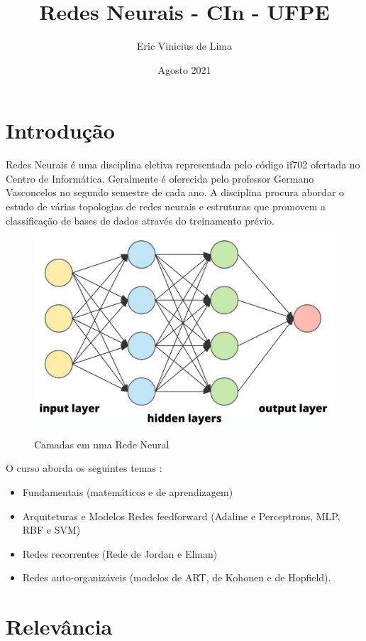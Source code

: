 \documentclass{article}
\title{Redes Neurais - CIn - UFPE}
\author{Eric Vinicius de Lima}
\date{Agosto 2021}
\begin{document}
\maketitle

\section{Introdução}

Redes Neurais é uma disciplina eletiva representada pelo código if702 ofertada no Centro de Informática. Geralmente é oferecida pelo professor Germano Vasconcelos \cite{professor} no segundo semestre de cada ano. A disciplina procura abordar o estudo de várias topologias de redes neurais e estruturas que promovem a classificação de bases de dados através do treinamento prévio. \cite{course}

\begin{figure}[h]
\centering
\includegraphics[scale=0.2]{layers.jpg}
\caption{Camadas em uma Rede Neural \citep{figure1}}
\label{figura_1}
\end{figure}

O curso aborda os seguintes temas \cite{course}:
\begin{itemize}
    \item Fundamentais (matemáticos e de aprendizagem) \item Arquiteturas e Modelos Redes feedforward (Adaline e Perceptrons, MLP, RBF e SVM) 
    \item Redes recorrentes (Rede de Jordan e Elman) \item Redes auto-organizáveis (modelos de ART, de Kohonen e de Hopfield).
\end{itemize}


\section{Relevância}
\end{document}
